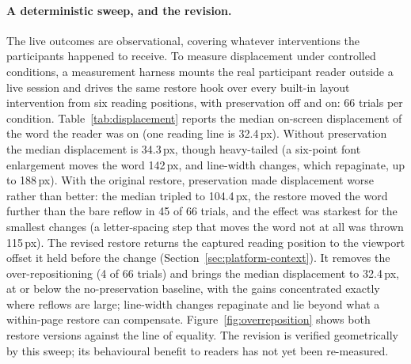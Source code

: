 \paragraph{A deterministic sweep, and the revision.}
The live outcomes are observational, covering whatever interventions the participants happened to receive.
To measure displacement under controlled conditions, a measurement harness mounts the real participant reader outside a live session and drives the same restore hook over every built-in layout intervention from six reading positions, with preservation off and on: 66 trials per condition.
Table~\ref{tab:displacement} reports the median on-screen displacement of the word the reader was on (one reading line is 32.4\,px).
Without preservation the median displacement is 34.3\,px, though heavy-tailed (a six-point font enlargement moves the word 142\,px, and line-width changes, which repaginate, up to 188\,px).
With the original restore, preservation made displacement worse rather than better: the median tripled to 104.4\,px, the restore moved the word further than the bare reflow in 45 of 66 trials, and the effect was starkest for the smallest changes (a letter-spacing step that moves the word not at all was thrown 115\,px).
The revised restore returns the captured reading position to the viewport offset it held before the change (Section~\ref{sec:platform-context}).
It removes the over-repositioning (4 of 66 trials) and brings the median displacement to 32.4\,px, at or below the no-preservation baseline, with the gains concentrated exactly where reflows are large; line-width changes repaginate and lie beyond what a within-page restore can compensate.
Figure~\ref{fig:overreposition} shows both restore versions against the line of equality.
The revision is verified geometrically by this sweep; its behavioural benefit to readers has not yet been re-measured.

